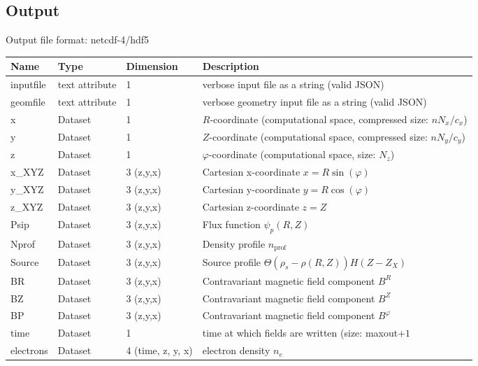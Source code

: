\subsection{Output}
Output file format: netcdf-4/hdf5
%
\begin{longtable}{lll>{\RaggedRight}p{7cm}}
\toprule
\rowcolor{gray!50}\textbf{Name} &  \textbf{Type} & \textbf{Dimension} & \textbf{Description}  \\ \midrule
inputfile  &     text attribute & 1 & verbose input file as a string (valid JSON) \\
geomfile   &     text attribute & 1 & verbose geometry input file as a string (valid JSON) \\
x                & Dataset & 1 & $R$-coordinate (computational space, compressed size: $nN_x/c_x$)\\
y                & Dataset & 1 & $Z$-coordinate (computational space, compressed size: $nN_y/c_y$)\\
z                & Dataset & 1 & $\varphi$-coordinate (computational space, size: $N_z$) \\
x\_XYZ           & Dataset & 3 (z,y,x) & Cartesian x-coordinate $x=R\sin(\varphi)$ \\
y\_XYZ           & Dataset & 3 (z,y,x) & Cartesian y-coordinate $y=R\cos(\varphi)$\\
z\_XYZ           & Dataset & 3 (z,y,x) & Cartesian z-coordinate $z=Z$ \\
Psip             & Dataset & 3 (z,y,x) & Flux function $\psi_p(R,Z)$ \\
Nprof            & Dataset & 3 (z,y,x) & Density profile $n_\text{prof}$ \\
Source           & Dataset & 3 (z,y,x) & Source  profile $\Theta(\rho_{s} - \rho(R,Z)) H(Z-Z_X)$\\
BR               & Dataset & 3 (z,y,x) & Contravariant magnetic field component $B^R$ \\
BZ               & Dataset & 3 (z,y,x) & Contravariant magnetic field component $B^Z$ \\
BP               & Dataset & 3 (z,y,x) & Contravariant magnetic field component $B^\varphi$ \\
time             & Dataset & 1 & time at which fields are written (size: maxout$+1$ \\
electrons        & Dataset & 4 (time, z, y, x) & electron density $n_e$ \\

\end{longtable}
